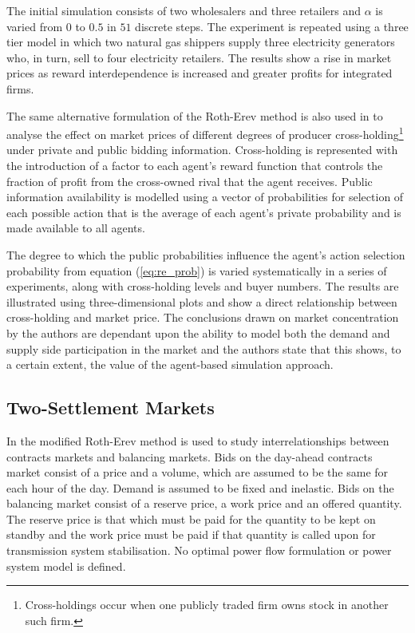 The initial simulation consists of two wholesalers and three retailers and
$\alpha$ is varied from $0$ to $0.5$ in $51$ discrete steps.  The experiment is
repeated using a three tier model in which two natural gas shippers supply three
electricity generators who, in turn, sell to four electricity retailers. The
results show a rise in market prices as reward interdependence is increased and
greater profits for integrated firms.

The same alternative formulation of the Roth-Erev method is also used in
 to analyse the effect on market prices of different degrees
of producer cross-holding\footnote{Cross-holdings occur when one publicly traded
firm owns stock in another such firm.} under private and public bidding
information.  Cross-holding is represented with the introduction of a factor to
each agent's reward function that controls the fraction of profit from the
cross-owned rival that the agent receives.  Public information availability is
modelled using a vector of probabilities for selection of each possible action
that is the average of each agent's private probability and is made available to
all agents.

The degree to which the public probabilities influence the agent's action
selection probability from equation (\ref{eq:re_prob}) is varied systematically
in a series of experiments, along with cross-holding levels and buyer numbers.
The results are illustrated using three-dimensional plots and show a direct
relationship between cross-holding and market price. The conclusions drawn on
market concentration by the authors are dependant upon the ability to model both
the demand and supply side participation in the market and the authors state
that this shows, to a certain extent, the value of the agent-based simulation
approach.

\subsection{Two-Settlement Markets}
In  the modified Roth-Erev method is used to study
interrelationships between contracts markets and balancing markets.  Bids on the
day-ahead contracts market consist of a price and a volume, which are assumed to
be the same for each hour of the day.  Demand is assumed to be fixed and
inelastic.  Bids on the balancing market consist of a reserve price, a work
price and an offered quantity.  The reserve price is that which must be paid for
the quantity to be kept on standby and the work price must be paid if that
quantity is called upon for transmission system stabilisation. No optimal power
flow formulation or power system model is defined.

